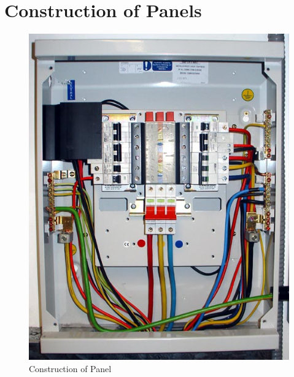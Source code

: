 \documentclass[12pt,fleqn]{book} %
\begin{document}
\section {Construction of Panels}
\begin{figure}[h!]
    \centering
    \includegraphics[width=0.5\linewidth]{fergany 1.png}
    \caption{Construction of Panel}
    \label{fig:fergany 1}
\end{figure}
\end{document}
